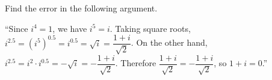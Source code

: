 Find the error in the following argument.

``Since $i^4=1$, we have $i^5=i$. Taking square roots, $i^{2.5}=\left(i^5\right)^{0.5}=i^{0.5}=\sqrt{i}=\dfrac{1+i}{\sqrt2}$. On the other hand, $i^{2.5}=i^2\cdot i^{0.5}=-\sqrt i=-\dfrac{1+i}{\sqrt2}$. Therefore $\dfrac{1+i}{\sqrt2}=-\dfrac{1+i}{\sqrt2}$, so $1+i=0$.''\,
